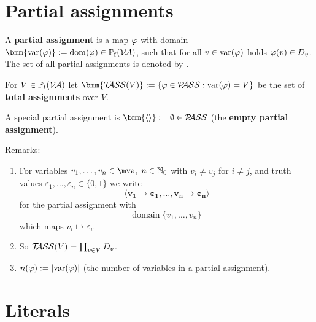 \documentclass[12pt]{book}
\begin{document}
\section{Partial assignments}
\label{sec:Partialassignments}

\begin{defi}\label{def:Pass}
      A \textbf{partial assignment} is a map $\varphi$ with domain $\bmm{\var(\vp)} := \dom(\vp) \in \pote(\Va)$, such that for all $v \in \operatorname{var}(\varphi)$ holds $\varphi(v) \in D_v$. 
	  The set of all partial assignments is denoted by \bmm{\Pass}.

      For $V \in \operatorname{\mathbb{P}_f}(\mathcal{V\hspace{-0.1em}A})$ let $\bmm{\Tass(V)} := \set{\vp \in \Pass : \var(\vp) = V}$ be the set of \textbf{total assignments} over $V$.

      A special partial assignment is $\bmm{\epa} := \es \in \Pass$ (the \textbf{empty partial assignment}).
\end{defi}
Remarks:
\begin{enumerate}
      \item For variables $v_1, \ldots, v_n \in \mva, \; n\in \mathbb{N}_0$ with $v_i \neq v_j$ for $i\neq j$, and truth values $\varepsilon_1, \ldots, \varepsilon_n \in \{0,1\}$ we write
      \begin{displaymath}
            \pmb{\langle v_1 \to \varepsilon_1, \ldots, v_n \to \varepsilon_n\rangle}
      \end{displaymath}
      for the partial assignment with
      \begin{displaymath}
            \mbox{domain} \; \{v_1, \ldots, v_n\}
      \end{displaymath}
      which maps $v_i \mapsto \varepsilon_i$.
      \item So $\mathcal{T\hspace{-0.35em}ASS}(V) = \prod_{v \in V} D_v$.
      \item $n(\varphi) := \lvert \operatorname{var}(\varphi)  \rvert$ (the number of variables in a partial assignment).
\end{enumerate}

\section{Literals}
\label{sec:Litsvar}
\end{document}
